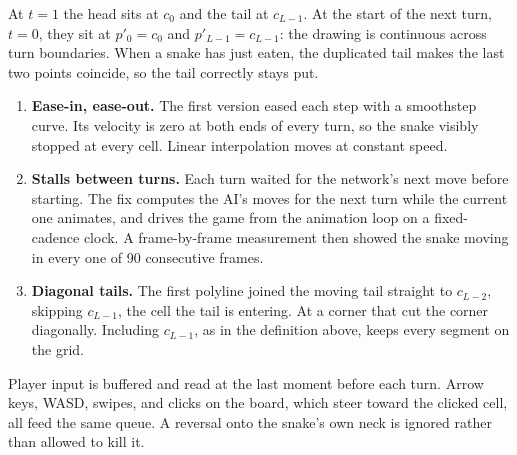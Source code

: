 At $t=1$ the head sits at $c_0$ and the tail at $c_{L-1}$. At the start of the next turn,
$t=0$, they sit at $p'_0 = c_0$ and $p'_{L-1}=c_{L-1}$: the drawing is continuous across
turn boundaries. When a snake has just eaten, the duplicated tail makes the last two
points coincide, so the tail correctly stays put.

\begin{warnbox}
\begin{enumerate}
\item \textbf{Ease-in, ease-out.} The first version eased each step with a smoothstep
  curve. Its velocity is zero at both ends of every turn, so the snake visibly stopped at
  every cell. Linear interpolation moves at constant speed.
\item \textbf{Stalls between turns.} Each turn waited for the network's next move before
  starting. The fix computes the AI's moves for the next turn while the current one
  animates, and drives the game from the animation loop on a fixed-cadence clock. A
  frame-by-frame measurement then showed the snake moving in every one of 90 consecutive
  frames.
\item \textbf{Diagonal tails.} The first polyline joined the moving tail straight to
  $c_{L-2}$, skipping $c_{L-1}$, the cell the tail is entering. At a corner that cut the
  corner diagonally. Including $c_{L-1}$, as in the definition above, keeps every segment
  on the grid.
\end{enumerate}
\end{warnbox}

Player input is buffered and read at the last moment before each turn. Arrow keys, WASD,
swipes, and clicks on the board, which steer toward the clicked cell, all feed the same
queue. A reversal onto the snake's own neck is ignored rather than allowed to kill it.
